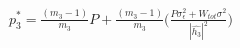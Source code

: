 \documentclass[preview]{standalone}
\begin{document}
\begin{align*}
p_3^\ast= \frac{\left(m_3 - 1\right)}{m_3} P + \frac{\left(m_3 - 1\right)}{m_3} \Bigg( \frac{P \sigma_\epsilon^2 + W_{tot} \sigma^2 }{ \left| \hat{h_3} \right| ^2 } \Bigg)
\end{align*}
\end{document}
